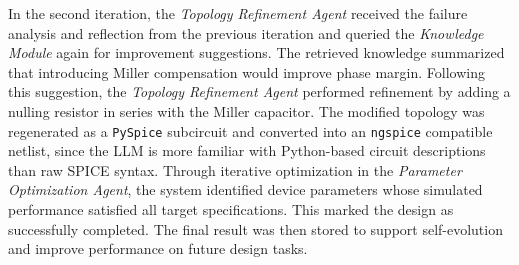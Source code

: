 \documentclass[sigconf,nonacm]{acmart}
\begin{document}
In the second iteration, the \emph{Topology Refinement Agent} received the failure analysis and reflection from the previous iteration and queried the \emph{Knowledge Module} again for improvement suggestions. The retrieved knowledge summarized that introducing Miller compensation would improve phase margin. Following this suggestion, the \emph{Topology Refinement Agent} performed refinement by adding a nulling resistor in series with the Miller capacitor. The modified topology was regenerated as a \texttt{PySpice} \cite{PySpice}  subcircuit and converted into an \texttt{ngspice} \cite{sourceforgeNgspice} compatible netlist, since the LLM is more familiar with Python-based circuit descriptions than raw SPICE syntax. 
Through iterative optimization in the \emph{Parameter Optimization Agent}, the system identified device parameters whose simulated performance satisfied all target specifications. This marked the design as successfully completed. The final result was then stored to support self-evolution and improve performance on future design tasks.

\begin{table}[]
	\centering
	\caption{Spec targets and simulation results in the example.}
	\label{tab:spec_case_study}
\end{table}
\end{document}
